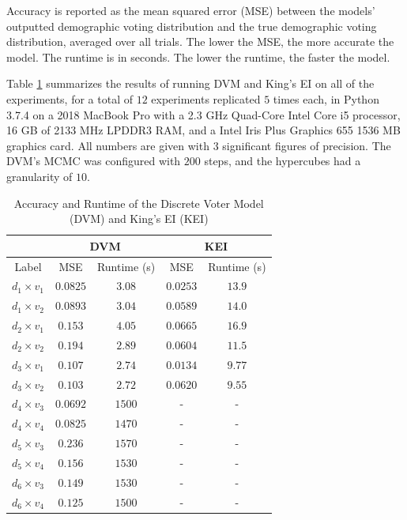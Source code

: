 \documentclass[fleqn,10pt]{style}
\begin{document}
Accuracy is reported as the mean squared error (MSE) between the models' outputted demographic voting distribution and the true demographic voting distribution, averaged over all trials. The lower the MSE, the more accurate the model. The runtime is in seconds. The lower the runtime, the faster the model.

Table \ref{table:results} summarizes the results of running DVM and King's EI on all of the experiments, for a total of $12$ experiments replicated $5$ times each, in Python 3.7.4 on a 2018 MacBook Pro with a 2.3 GHz Quad-Core Intel Core i5 processor, 16 GB of 2133 MHz LPDDR3 RAM, and a Intel Iris Plus Graphics 655 1536 MB graphics card. All numbers are given with $3$ significant figures of precision. The DVM's MCMC was configured with $200$ steps, and the hypercubes had a granularity of $10$.

\begin{table}[ht]
 \centering
 \caption{Accuracy and Runtime of the Discrete Voter Model (DVM) and King's EI (KEI)}
 \label{table:results}
 \begin{tabular}{|c|c|c|c|c|}
   \hline
   & \multicolumn{2}{|c|}{DVM} & \multicolumn{2}{|c|}{KEI} \\
   \hline
   Label & MSE & Runtime (s) & MSE & Runtime (s) \\
   \hline
   $d_1 \times v_1$ & $0.0825$ & $3.08$ & $0.0253$ & $13.9$ \\
   $d_1 \times v_2$ & $0.0893$ & $3.04$ & $0.0589$ & $14.0$ \\
   \hline
   $d_2 \times v_1$ & $0.153$ & $4.05$ & $0.0665$ & $16.9$ \\
   $d_2 \times v_2$ & $0.194$ & $2.89$ & $0.0604$ & $11.5$ \\
   \hline
   $d_3 \times v_1$ & $0.107$ & $2.74$ & $0.0134$ & $9.77$ \\
   $d_3 \times v_2$ & $0.103$ & $2.72$ & $0.0620$ & $9.55$ \\
   \hline
   $d_4 \times v_3$ & $0.0692$ & $1500$ & - & - \\
   $d_4 \times v_4$ & $0.0825$ & $1470$ & - & - \\
   \hline
   $d_5 \times v_3$ & $0.236$ & $1570$ & - & - \\
   $d_5 \times v_4$ & $0.156$ & $1530$ & - & - \\
   \hline
   $d_6 \times v_3$ & $0.149$ & $1530$ & - & - \\
   $d_6 \times v_4$ & $0.125$ & $1500$ & - & - \\
  \hline
 \end{tabular}
\end{table}
\end{document}
